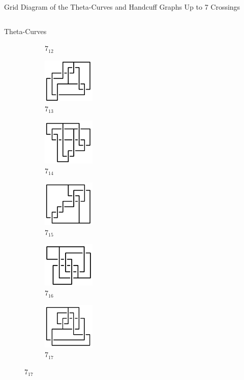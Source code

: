 \documentclass[final]{beamer}
\begin{document}
\begin{frame}[t]
\begin{alertblock}{Grid Diagram of the Theta-Curves and Handcuff Graphs Up to 7 Crossings}
\begin{columns}[t]
\begin{column}{0.7\textwidth}
\begin{alertblock}{Theta-Curves}
\begin{figure}
\begin{subfigure}{0.075\textwidth}
    \caption{$7_{12}$} 
    \end{subfigure}
    \begin{subfigure}{0.075\textwidth}
    \includegraphics[width=2.5cm]{../Midterm_Poster/grid_diagram/theta_7_13.png}
    \caption{$7_{13}$} 
    \end{subfigure}
    \begin{subfigure}{0.075\textwidth}
    \includegraphics[width=2.5cm]{../Midterm_Poster/grid_diagram/theta_7_14.png}
    \caption{$7_{14}$} 
    \end{subfigure}
    \begin{subfigure}{0.075\textwidth}
    \includegraphics[width=2.5cm]{../Midterm_Poster/grid_diagram/theta_7_15.png}
    \caption{$7_{15}$} 
    \end{subfigure}
    \begin{subfigure}{0.075\textwidth}
    \includegraphics[width=2.5cm]{../Midterm_Poster/grid_diagram/theta_7_16.png}
    \caption{$7_{16}$} 
    \end{subfigure}
    \begin{subfigure}{0.075\textwidth}
    \includegraphics[width=2.5cm]{../Midterm_Poster/grid_diagram/theta_7_17.png}
    \caption{$7_{17}$} 
    \end{subfigure}

\end{figure}
\end{alertblock}
\end{column}
\end{columns}
\end{alertblock}
\end{frame}
\end{document}
